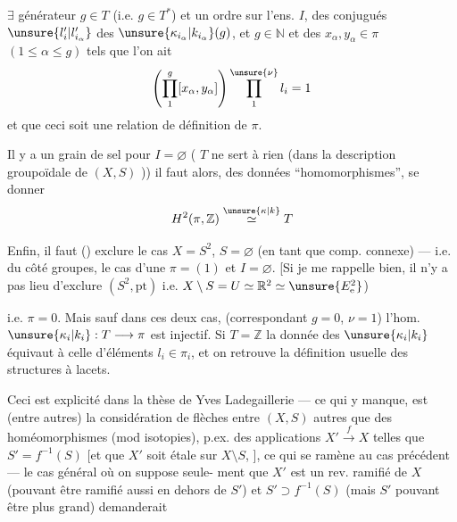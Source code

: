 
$\exists$ générateur $g\in T$ (i.e. $g\in T^*$) et un ordre
sur l'ens. $I$,   des conjugués
$\unsure{l_i'|l_{i_\alpha}'}$ des $\unsure{\kappa_{i_\alpha}|k_{i_\alpha}}(g)$, et $g\in\mathbb N$ et des $x_\alpha,y_\alpha\in\pi$
$(1\leq\alpha\leq g)$ tels que l'on ait
\[
\left(\prod_1^g[x_\alpha,y_\alpha]\right)\prod_1^{\unsure{\nu}}l_i=1
\]
et que ceci soit une relation de définition
de $\pi$.

Il y a  un grain de sel pour $I=\varnothing$
( $T$ ne sert à rien  (dans la
description groupoïdale de $(X,S)$ \unsure{$\simeq$} ))
il faut alors,   des données
``homomorphismes'', se donner
\[
H^2(\pi,\mathbb Z)\overset{\unsure{\kappa|k}}{\simeq}T
\]

Enfin, il faut   
() exclure le cas $X=S^2$, $S=\varnothing$
(en tant que comp. connexe) --- i.e.
du côté groupes, le cas d'une 
$\pi=(1)$  et $I=\varnothing$.
[Si je me rappelle bien, il n'y a pas lieu
d'exclure $(S^2,\mathrm{pt})$ i.e. $X\setminus S=U\simeq\mathbb R^2\simeq\unsure{E^2_{\mathrm e}}$)

 i.e. $\pi=0$. Mais sauf dans ces
deux cas,  (correspondant
 $g=0$, $\nu=1$) l'hom. $\unsure{\kappa_i|k_i}:T\longrightarrow\pi$
est injectif. Si $T=\mathbb Z$ la donnée des $\unsure{\kappa_i|k_i}$
équivaut à celle d'éléments $l_i\in\pi_i$, et on
retrouve la définition usuelle des
structures à lacets.

Ceci est explicité dans la thèse de
Yves Ladegaillerie --- ce qui y manque, est
(entre autres) la considération de flèches
entre $(X,S)$ autres que des homéomorphismes
(mod isotopies), p.ex. des applications 
 $X'\xrightarrow{f}X$ telles que $S'=f^{-1}(S)$
[et que $X'$ soit étale sur $X\setminus S$, ],
ce qui se ramène au cas précédent
--- le cas  général où on suppose seule-
ment que $X'$ est un rev. ramifié
de $X$ (pouvant être ramifié aussi en
dehors de $S'$) et $S'\supset f^{-1}(S)$ (mais $S'$
pouvant être plus grand) demanderait


